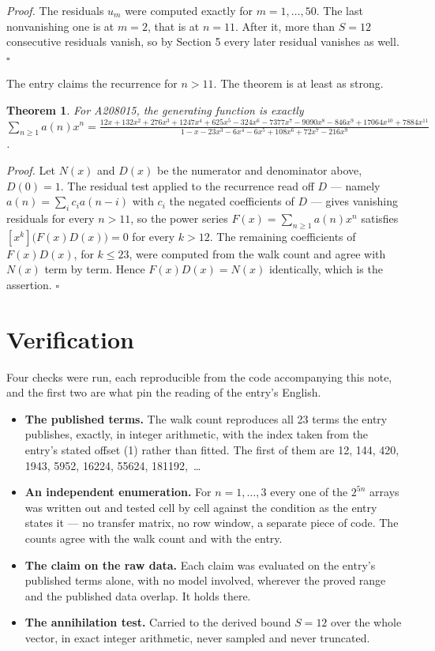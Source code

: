 \documentclass[11pt]{article}
\newtheorem{theorem}{Theorem}
\theoremstyle{definition}
\begin{document}
{\itshape Proof.} The residuals $u_m$ were computed exactly for $m = 1,\dots,50$. The last nonvanishing one is at $m = 2$, that is at $n = 11$. After it, more than $S = 12$ consecutive residuals vanish, so by Section 5 every later residual vanishes as well. $\square$

The entry claims the recurrence for $n > 11$. The theorem is at least as strong.

\begin{theorem} For A208015, the generating function is exactly $\sum_{n\ge 1} a(n)x^n = \frac{12x + 132x^{2} + 276x^{3} + 1247x^{4} + 625x^{5} - 324x^{6} - 7377x^{7} - 9090x^{8} - 846x^{9} + 17064x^{10} + 7884x^{11}}{1 - x - 23x^{3} - 6x^{4} - 6x^{5} + 108x^{6} + 72x^{7} - 216x^{9}}$.\end{theorem}

{\itshape Proof.} Let $N(x)$ and $D(x)$ be the numerator and denominator above, $D(0)=1$. The residual test applied to the recurrence read off $D$ --- namely $a(n) = \sum_i c_i a(n-i)$ with $c_i$ the negated coefficients of $D$ --- gives vanishing residuals for every $n > 11$, so the power series $F(x)=\sum_{n\ge 1}a(n)x^n$ satisfies $[x^k]\bigl(F(x)D(x)\bigr) = 0$ for every $k > 12$. The remaining coefficients of $F(x)D(x)$, for $k \le 23$, were computed from the walk count and agree with $N(x)$ term by term. Hence $F(x)D(x) = N(x)$ identically, which is the assertion. $\square$

\section{Verification}

Four checks were run, each reproducible from the code accompanying this note, and the first two are what pin the reading of the entry's English.

\begin{itemize}

\item {\bfseries The published terms.} The walk count reproduces all 23 terms the entry publishes, exactly, in integer arithmetic, with the index taken from the entry's stated offset (1) rather than fitted. The first of them are 12, 144, 420, 1943, 5952, 16224, 55624, 181192,~\dots

\item {\bfseries An independent enumeration.} For $n = 1,\dots,3$ every one of the $2^{5n}$ arrays was written out and tested cell by cell against the condition as the entry states it --- no transfer matrix, no row window, a separate piece of code. The counts agree with the walk count and with the entry.

\item {\bfseries The claim on the raw data.} Each claim was evaluated on the entry's published terms alone, with no model involved, wherever the proved range and the published data overlap. It holds there.

\item {\bfseries The annihilation test.} Carried to the derived bound $S = 12$ over the whole vector, in exact integer arithmetic, never sampled and never truncated.

\end{itemize}
\end{document}
